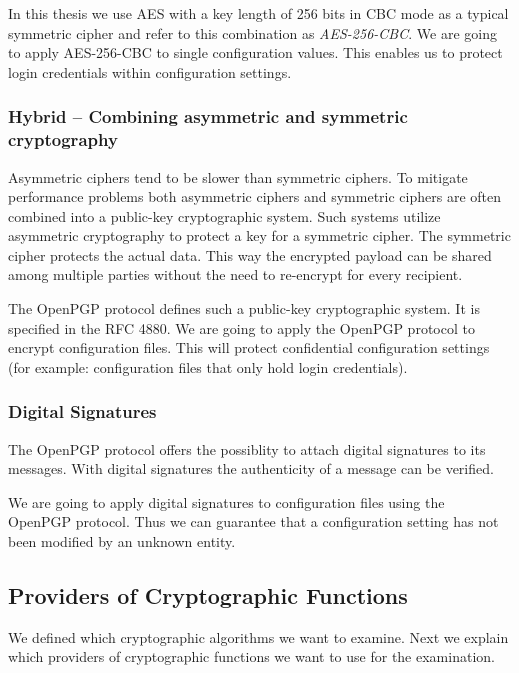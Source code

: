 In this thesis we use AES with a key length of 256 bits in CBC mode as a typical symmetric cipher and refer to this combination as \emph{AES-256-CBC}.
We are going to apply AES-256-CBC to single configuration values.
This enables us to protect login credentials within configuration settings.

\subsubsection{Hybrid -- Combining asymmetric and symmetric cryptography}

Asymmetric ciphers tend to be slower than symmetric ciphers.
To mitigate performance problems both asymmetric ciphers and symmetric ciphers are often combined into a public-key cryptographic system.
Such systems utilize asymmetric cryptography to protect a key for a symmetric cipher.
The symmetric cipher protects the actual data.
This way the encrypted payload can be shared among multiple parties without the need to re-encrypt for every recipient.\cite{stallings2014} 

The OpenPGP protocol defines such a public-key cryptographic system.
It is specified in the RFC 4880.\cite{rfc4880}
We are going to apply the OpenPGP protocol to encrypt configuration files.
This will protect confidential configuration settings (for example: configuration files that only hold login credentials).

\subsubsection{Digital Signatures}

The OpenPGP protocol offers the possiblity to attach digital signatures to its messages.\cite{rfc4880}
With digital signatures the authenticity of a message can be verified.\cite{bruceschneier1996,stallings2014}

We are going to apply digital signatures to configuration files using the OpenPGP protocol.
Thus we can guarantee that a configuration setting has not been modified by an unknown entity.

\subsection{Providers of Cryptographic Functions}
\label{intro-provider}

We defined which cryptographic algorithms we want to examine.
Next we explain which providers of cryptographic functions we want to use for the examination.

